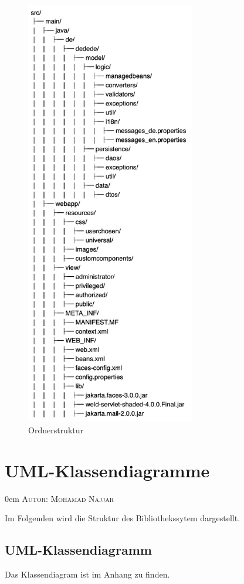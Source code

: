 \documentclass{article}
\makeatletter
\newcommand{\sectionauthor}[1]{
	{\parindent 0em \large \scshape Autor: #1 \par \nobreak \vspace*{1em}}
	\@afterheading
}
\makeatother
\begin{document}
\begin{figure}[H]
\centering
\hypertarget{Paketstruktur}{}
\includegraphics[width = 20em]{FileStructure}
\caption{Ordnerstruktur}
\end{figure}

\section{UML-Klassendiagramme}
\sectionauthor{Mohamad Najjar}
Im Folgenden wird die Struktur des Bibliothekssytem dargestellt.
\subsection{UML-Klassendiagramm}
Das Klassendiagram ist im Anhang zu finden.
\end{document}
